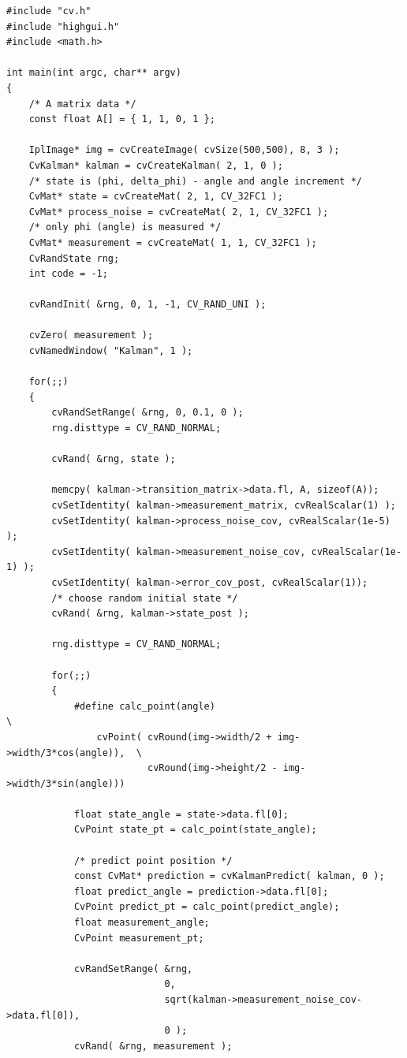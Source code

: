 \begin{lstlisting}
#include "cv.h"
#include "highgui.h"
#include <math.h>

int main(int argc, char** argv)
{
    /* A matrix data */
    const float A[] = { 1, 1, 0, 1 };

    IplImage* img = cvCreateImage( cvSize(500,500), 8, 3 );
    CvKalman* kalman = cvCreateKalman( 2, 1, 0 );
    /* state is (phi, delta_phi) - angle and angle increment */
    CvMat* state = cvCreateMat( 2, 1, CV_32FC1 );
    CvMat* process_noise = cvCreateMat( 2, 1, CV_32FC1 );
    /* only phi (angle) is measured */
    CvMat* measurement = cvCreateMat( 1, 1, CV_32FC1 );
    CvRandState rng;
    int code = -1;

    cvRandInit( &rng, 0, 1, -1, CV_RAND_UNI );

    cvZero( measurement );
    cvNamedWindow( "Kalman", 1 );

    for(;;)
    {
        cvRandSetRange( &rng, 0, 0.1, 0 );
        rng.disttype = CV_RAND_NORMAL;

        cvRand( &rng, state );

        memcpy( kalman->transition_matrix->data.fl, A, sizeof(A));
        cvSetIdentity( kalman->measurement_matrix, cvRealScalar(1) );
        cvSetIdentity( kalman->process_noise_cov, cvRealScalar(1e-5) );
        cvSetIdentity( kalman->measurement_noise_cov, cvRealScalar(1e-1) );
        cvSetIdentity( kalman->error_cov_post, cvRealScalar(1));
        /* choose random initial state */
        cvRand( &rng, kalman->state_post );

        rng.disttype = CV_RAND_NORMAL;

        for(;;)
        {
            #define calc_point(angle)                                      \
                cvPoint( cvRound(img->width/2 + img->width/3*cos(angle)),  \
                         cvRound(img->height/2 - img->width/3*sin(angle)))

            float state_angle = state->data.fl[0];
            CvPoint state_pt = calc_point(state_angle);

            /* predict point position */
            const CvMat* prediction = cvKalmanPredict( kalman, 0 );
            float predict_angle = prediction->data.fl[0];
            CvPoint predict_pt = calc_point(predict_angle);
            float measurement_angle;
            CvPoint measurement_pt;

            cvRandSetRange( &rng,
                            0,
                            sqrt(kalman->measurement_noise_cov->data.fl[0]),
                            0 );
            cvRand( &rng, measurement );


\end{lstlisting}
